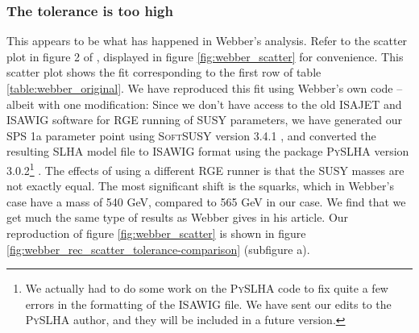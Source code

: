 \documentclass[twoside,english]{uiofysmaster}
\begin{document}
\subsubsection{The tolerance is too high}

This appears to be what has happened in Webber's analysis. Refer to the scatter plot in figure 2 of \cite{Webber:2009vm}, displayed in figure \vref{fig:webber_scatter} for convenience. This scatter plot shows the fit corresponding to the first row of table \ref{table:webber_original}. We have reproduced this fit using Webber's own code -- albeit with one modification: Since we don't have access to the old ISAJET and ISAWIG software for RGE running of SUSY parameters, we have generated our SPS 1a parameter point using {\scshape SoftSUSY} version 3.4.1 \cite{Allanach:2001kg}, and converted the resulting SLHA \cite{Skands:2003cj} model file to ISAWIG format using the package {\scshape PySLHA} version 3.0.2\footnote{We actually had to do some work on the {\scshape PySLHA} code to fix quite a few errors in the formatting of the ISAWIG file. We have sent our edits to the {\scshape PySLHA} author, and they will be included in a future version.} \cite{Buckley:2013jua}. The effects of using a different RGE runner is that the SUSY masses are not exactly equal. The most significant shift is the squarks, which in Webber's case have a mass of 540 GeV, compared to 565 GeV in our case. We find that we get much the same type of results as Webber gives in his article. Our reproduction of figure \ref{fig:webber_scatter} is shown in figure \vref{fig:webber_rec_scatter_tolerance-comparison} (subfigure a). 
\end{document}
